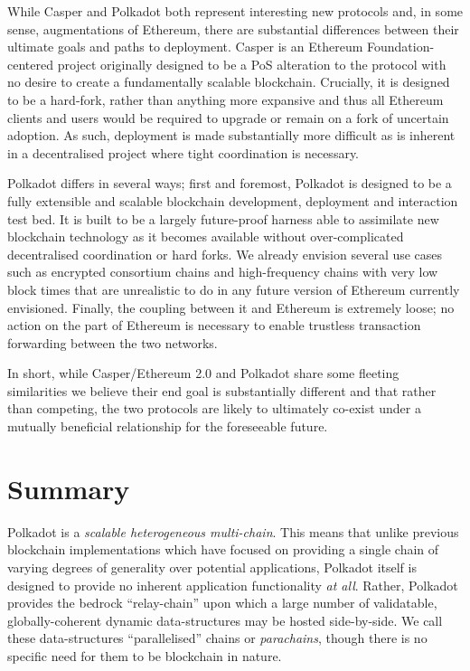 \documentclass[usepdftitle=false]{beamer}
\begin{document}
\begin{frame}
 While Casper and Polkadot both represent interesting new protocols and, in some sense, augmentations of Ethereum, there are substantial differences between their ultimate goals and paths to deployment. Casper is an Ethereum Foundation-centered project originally designed to be a PoS alteration to the protocol with no desire to create a fundamentally scalable blockchain. Crucially, it is designed to be a hard-fork, rather than anything more expansive and thus all Ethereum clients and users would be required to upgrade or remain on a fork of uncertain adoption. As such, deployment is made substantially more difficult as is inherent in a decentralised project where tight coordination is necessary.

 Polkadot differs in several ways; first and foremost, Polkadot is designed to be a fully extensible and scalable blockchain development, deployment and interaction test bed. It is built to be a largely future-proof harness able to assimilate new blockchain technology as it becomes available without over-complicated decentralised coordination or hard forks. We already envision several use cases such as encrypted consortium chains and high-frequency chains with very low block times that are unrealistic to do in any future version of Ethereum currently envisioned. Finally, the coupling between it and Ethereum is extremely loose; no action on the part of Ethereum is necessary to enable trustless transaction forwarding between the two networks.

 In short, while Casper/Ethereum 2.0 and Polkadot share some fleeting similarities we believe their end goal is substantially different and that rather than competing, the two protocols are likely to ultimately co-exist under a mutually beneficial relationship for the foreseeable future.

\section{Summary}\label{summary}

Polkadot is a \emph{scalable heterogeneous multi-chain}. This means that unlike previous blockchain implementations which have focused on providing a single chain of varying degrees of generality over potential applications, Polkadot itself is designed to provide no inherent application functionality \emph{at all}. Rather, Polkadot provides the bedrock ``relay-chain'' upon which a large number of validatable, globally-coherent dynamic data-structures may be hosted side-by-side. We call these data-structures ``parallelised'' chains or \textit{parachains}, though there is no specific need for them to be blockchain in nature.


\end{frame}
\end{document}
